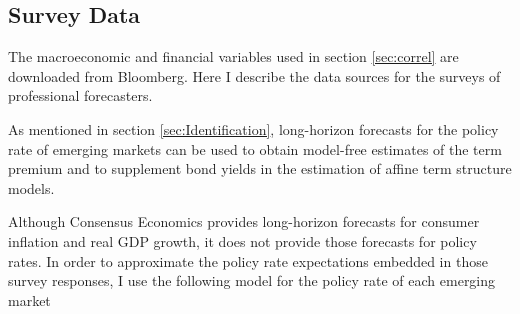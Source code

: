 {%
%


\subsection{Survey Data} \label{sec:SurveyData}
The macroeconomic and financial variables used in section \ref{sec:correl} are downloaded from Bloomberg. Here I describe the data sources for 
the surveys of professional forecasters.

As mentioned in section \ref{sec:Identification}, long-horizon forecasts for the policy rate of emerging markets can be used to obtain model-free estimates of the term premium and to supplement bond yields in the estimation of affine term structure models.

Although Consensus Economics provides long-horizon forecasts for consumer inflation and real GDP growth, it does not provide those forecasts for policy rates. In order to approximate the policy rate expectations embedded in those survey responses, I use the following model for the policy rate of each emerging market
	

}
